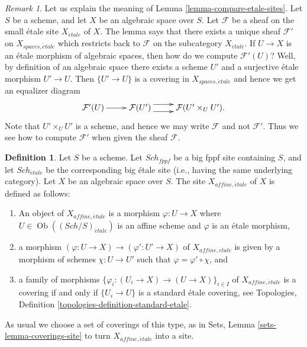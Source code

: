 \documentclass{stacks-project}
\theoremstyle{plain}
\theoremstyle{definition}
\newtheorem{definition}[subsection]{Definition}
\theoremstyle{remark}
\newtheorem{remark}[subsection]{Remark}
\numberwithin{equation}{subsection}
\def\Sch{\mathit{Sch}}
\def\Ob{\mathop{\mathrm{Ob}}\nolimits}
\def\etale{{\acute{e}tale}}
\begin{document}
\begin{remark}
\label{remark-explain-equivalence}
Let us explain the meaning of Lemma \ref{lemma-compare-etale-sites}.
Let $S$ be a scheme, and let $X$ be an algebraic space over $S$.
Let $\mathcal{F}$ be a sheaf on the small \'etale site $X_\etale$ of
$X$. The lemma says that there exists a unique sheaf $\mathcal{F}'$ on
$X_{spaces, \etale}$ which restricts back to $\mathcal{F}$ on the
subcategory $X_\etale$. If $U \to X$ is an \'etale morphism of
algebraic spaces, then how do we compute $\mathcal{F}'(U)$? Well, by definition
of an algebraic space there exists a scheme $U'$ and a surjective
\'etale morphism $U' \to U$. Then $\{U' \to U\}$ is a covering in
$X_{spaces, \etale}$ and hence we get an equalizer diagram
$$
\xymatrix{
\mathcal{F}'(U) \ar[r] &
\mathcal{F}(U') \ar@<1ex>[r] \ar@<-1ex>[r] &
\mathcal{F}(U' \times_U U').
}
$$
Note that $U' \times_U U'$ is a scheme, and hence we may
write $\mathcal{F}$ and not $\mathcal{F}'$.
Thus we see how to compute $\mathcal{F}'$
when given the sheaf $\mathcal{F}$.
\end{remark}

\begin{definition}
\label{definition-affine-etale-site}
Let $S$ be a scheme.
Let $\Sch_{fppf}$ be a big fppf site containing $S$,
and let $\Sch_\etale$ be the corresponding big \'etale site
(i.e., having the same underlying category).
Let $X$ be an algebraic space over $S$.
The site {\it $X_{affine, \etale}$} of $X$ is defined as follows:
\begin{enumerate}
\item An object of $X_{affine, \etale}$ is a morphism
$\varphi : U \to X$ where $U \in \Ob((\Sch/S)_\etale)$ is an affine scheme and
$\varphi$ is an \'etale morphism,
\item a morphism $(\varphi : U \to X) \to (\varphi' : U' \to X)$ of
$X_{affine, \etale}$ is given by a morphism of schemes
$\chi : U \to U'$ such that $\varphi = \varphi' \circ \chi$, and
\item a family of morphisms
$\{\varphi_i : (U_i \to X) \to (U \to X)\}_{i \in I}$
of $X_{affine, \etale}$ is a covering if and only if
$\{U_i \to U\}$ is a standard \'etale covering, see
Topologies, Definition \ref{topologies-definition-standard-etale}.
\end{enumerate}
As usual we choose a set of coverings of this type, as in
Sets, Lemma \ref{sets-lemma-coverings-site}
to turn $X_{affine, \etale}$ into a site.
\end{definition}
\end{document}
